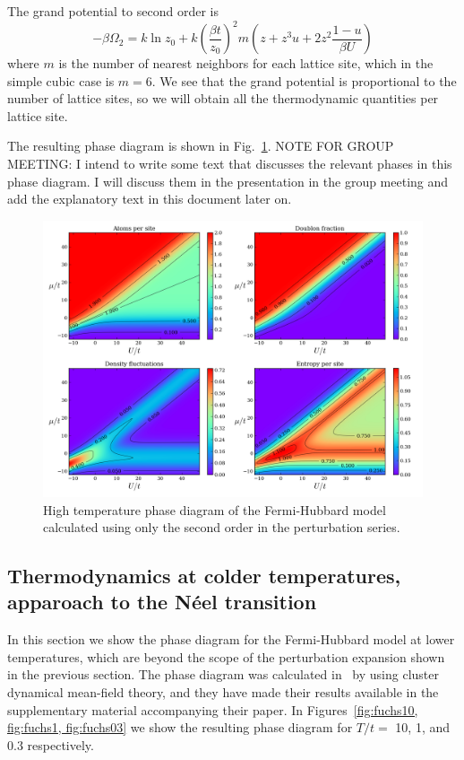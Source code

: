 \documentclass[11pt,letter]{article}
\begin{document}
The grand potential to second order is~\cite{Henderson1992,Jordens2010} 
\begin{equation}
-\beta \Omega_{2} = k \ln z_{0} + k \left( \frac{\beta t }{z_{0}} \right)^{2} m 
        \left( z + z^{3} u + 2z^{2} \frac{1-u}{\beta U} \right) 
\end{equation} 
where $m$ is the number of nearest neighbors for each lattice site, which in
the simple cubic case is $m=6$.  We see that the grand potential is
proportional to the number of lattice sites, so we will obtain all the
thermodynamic quantities per lattice site. 

The resulting phase diagram is shown in Fig.~\ref{fig:highTphases}.  NOTE FOR
GROUP MEETING:  I intend to write some text that discusses the relevant phases
in this phase diagram.  I will discuss them in the presentation in the group
meeting and add the explanatory text in this document later on.  
\begin{figure}
\centering \includegraphics[width=\textwidth]{../HighT_figures/phases2p5.png}
\caption[High temperature phase diagram of the Fermi-Hubbard model]{\small 
High temperature phase diagram of the Fermi-Hubbard model calculated using only the second order in the perturbation series. 
} \label{fig:highTphases}
\end{figure}

\subsection{Thermodynamics at colder temperatures, apparoach to the N\'{e}el transition}

In this section we show the phase diagram for the Fermi-Hubbard model at lower
temperatures, which are beyond the scope of the perturbation expansion shown in
the previous section.   The phase diagram was calculated in~\cite{Fuchs2011} by
using cluster dynamical mean-field theory, and they have made their results
available in the supplementary material accompanying their paper.  In
Figures~\ref{fig:fuchs10, fig:fuchs1, fig:fuchs03} we show the resulting phase
diagram for $T/t=$ 10, 1, and 0.3 respectively.
\end{document}
